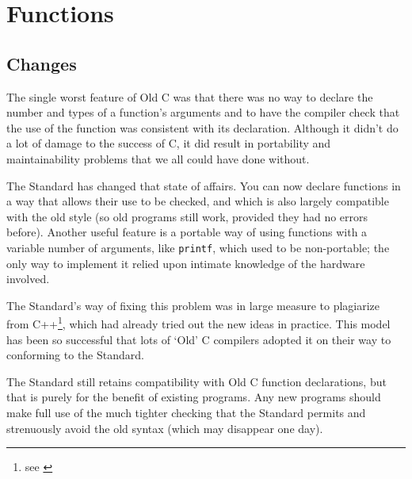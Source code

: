  \chapter{Functions}


        \section{Changes}
        

  

  The single worst feature of Old C was that there was no way to declare
   the number and types of a function's arguments and to have the compiler
   check that the use of the function was consistent with its declaration.
   Although it didn't do a lot of damage to the success of C, it did result
   in portability and maintainability problems that we all could have done
   without.


  The Standard has changed that state of affairs. You can now declare
   functions in a way that allows their use to be checked, and which is also
   largely compatible with the old style (so old programs still work,
   provided they had no errors before). Another useful feature is a portable
   way of using functions with a variable number of arguments, like
   \texttt{printf}, which used to be non-portable; the only way to
   implement it relied upon intimate knowledge of the hardware involved.


  The Standard's way of fixing this problem was in large measure to
  plagiarize from C++\footnote{see \cite{Stro}},
  which had already tried out the new ideas in
   practice. This model has been so successful that lots of `Old' C
   compilers adopted it on their way to conforming to the Standard.


  The Standard still retains compatibility with Old C function
   declarations, but that is purely for the benefit of existing programs.
   Any new programs should make full use of the much tighter checking that
   the Standard permits and strenuously avoid the old syntax (which may
   disappear one day).






